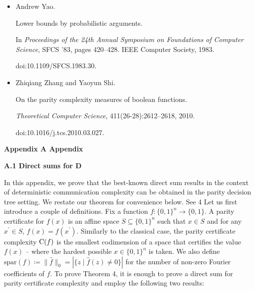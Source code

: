 \begin{itemize}
\item[] 
[56]

Andrew Yao.


Lower bounds by probabilistic arguments.


In \emph{Proceedings of the 24th Annual Symposium on Foundations of
Computer Science}, SFCS ’83, pages 420–428. IEEE Computer Society, 1983.


doi:10.1109/SFCS.1983.30.





\item[] 
[57]

Zhiqiang Zhang and Yaoyun Shi.


On the parity complexity measures of boolean functions.


\emph{Theoretical Computer Science}, 411(26-28):2612–2618, 2010.


doi:10.1016/j.tcs.2010.03.027.





\end{itemize}




\par\medskip\noindent\textbf{
Appendix A Appendix}\par




\par\medskip\noindent\textbf{
A.1 Direct sums for D
}\par




In this appendix, we prove that the best-known direct sum results in the context of deterministic communication complexity can be obtained in the parity decision tree setting. We restate our theorem for convenience below.
See 4
Let us first introduce a couple of definitions. Fix a function $f\colon\{0,1\}^{n}\to\{0,1\}$. A parity certificate for $f(x)$ is an affine space $S\subseteq\{0,1\}^{n}$ such that $x\in S$ and for any $x^{\prime}\in S$, $f(x)=f(x^{\prime})$. Similarly to the classical case, the parity certificate complexity ${\textup{C}}(f)$ is the smallest codimension of a space that certifies the value $f(x)$ – where the hardest possible $x\in\{0,1\}^{n}$ is taken. We also define $\mathrm{spar}(f)\coloneqq\|\hat{f}\|_{0}=|\{z\mid\hat{f}(z)\neq 0\}|$ for the number of non-zero Fourier coefficients of $f$. To prove Theorem 4, it is enough to prove a direct sum for parity certificate complexity and employ the following two results:\par


